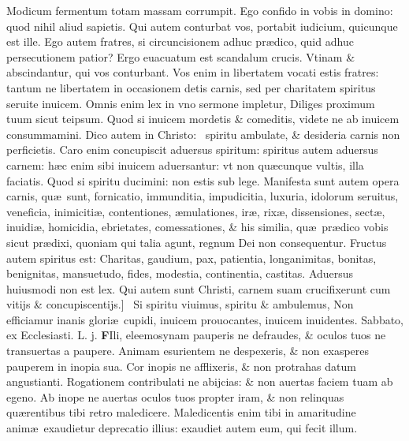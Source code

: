 \documentclass[a5paper,10pt]{book}
\def\leftmarginnote{%
	\lrmarginnote{\hskip -\marginparsep \hskip -6.5em}}
\def\rightmarginnote{%
	\lrmarginnote{\hskip\columnwidth \hskip -1em}}
\def\ae{æ}
\begin{document}
\begin{multicols*}{2}
Modicum fermentum totam massam corrumpit. Ego confido in vobis in domino: quod nihil aliud sapietis. Qui autem conturbat vos, portabit iudicium, quicunque est ille.
Ego autem fratres, si circuncisionem adhuc pr\ae dico, quid adhuc persecutionem patior? Ergo euacuatum est scandalum crucis.
Vtinam \& abscindantur, qui vos
conturbant.
Vos enim in libertatem vocati estis fratres: tantum ne libertatem in occasionem detis carnis, sed per charitatem spiritus seruite inuicem.
Omnis enim lex in vno sermone impletur, Diliges proximum tuum sicut teipsum. Quod si inuicem mordetis \& comeditis, videte ne ab inuicem consummamini.
Dico autem in Christo: \textdagger \ 
spiritu\leftmarginnote{\begin{flushright}B\end{flushright}} ambulate, \& desideria carnis non perficietis.
Caro enim concupiscit aduersus spiritum: spiritus autem aduersus carnem: h\ae c enim sibi inuicem aduersantur: vt non qu\ae cunque vultis, illa faciatis.
Quod si spiritu ducimini: non estis sub lege. Manifesta sunt autem opera carnis, qu\ae \ sunt, fornicatio, immunditia, impudicitia, luxuria, idolorum seruitus, veneficia, inimiciti\ae , contentiones, \ae mulationes, ir\ae , rix\ae , dissensiones, sect\ae , inuidi\ae , homicidia, ebrietates, comessationes, \& his similia, qu\ae \ pr\ae dico vobis sicut pr\ae dixi, quoniam qui talia agunt, regnum Dei non consequentur.
Fructus autem spiritus est: Charitas, gaudium, pax, patientia, longanimitas, bonitas, benignitas, mansuetudo, fides, modestia, continentia, castitas.
Aduersus huiusmodi non est lex. Qui autem sunt Christi, carnem suam crucifixerunt cum vitijs \& concupiscentijs.] \textdagger \ 
Si\rightmarginnote{C} spiritu viuimus, spiritu \& ambulemus, Non efficiamur inanis glori\ae \ cupidi, inuicem prouocantes, inuicem inuidentes.
\newline \textswab{C} \color{red} \hypertarget{SAT-PRIMA-VAGAN}{Sabbato,} ex Ecclesiasti. L. j. \color{black}
\bookmark[dest=SAT-PRIMA-VAGAN]{SABBATO}
\vspace{-.25em}
\lettrine[lines=2]{\bfseries F}{}Ili, eleemosynam\rightmarginnote{ca. 4.} pauperis ne defraudes, \& oculos tuos ne transuertas a paupere.
Animam esurientem ne despexeris, \& non exasperes pauperem in inopia sua. Cor inopis ne afflixeris, \& non protrahas datum angustianti.
Rogationem contribulati ne abijcias: \& non auertas faciem tuam ab egeno. Ab inope ne auertas oculos tuos propter iram, \& non relinquas qu\ae rentibus tibi retro maledicere.
Maledicentis enim tibi in amaritudine anim\ae \ exaudietur deprecatio illius: exaudiet autem eum, qui fecit illum.

\end{multicols*}
\end{document}
